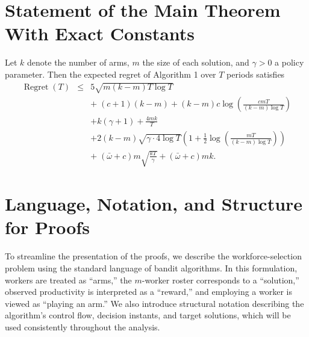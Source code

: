 \documentclass[opre,blindrev]{informs3}
\newcommand{\Regret}{\operatorname{Regret}}
\begin{document}
\newpage
\begin{APPENDICES}



    
\vspace{.1in}


\section{Statement of the Main Theorem With Exact Constants}\label{sec:thm-all-constants}
Let \(k\) denote the number of arms, \(m\) the size of each solution, and \(\gamma>0\) a policy parameter. Then the expected regret of Algorithm 1 over \(T\) periods satisfies
\begin{eqnarray*}
    \Regret(T) &\leq& 5\sqrt{m(k-m)T\log T}\\
    &&+\;(c+1)(k-m) +(k-m)c\log\left(\frac{cmT}{(k-m)\log T}\right)\\
    &&+ k(\gamma + 1) + \frac{4mk}{T}\\
    &&+2(k-m)\sqrt{\gamma \cdot 4\log T}
    \left(1+\frac{1}{2}\log\!\left(\frac{mT}{(k-m)\log T}\right)\right)\\
    &&+\;(\bar{\omega}+c) m\sqrt{\frac{kT}{\gamma}} + (\bar{\omega}+c)mk.
\end{eqnarray*}

\section{Language, Notation, and Structure for Proofs}
To streamline the presentation of the proofs, we describe the workforce-selection problem using the standard language of bandit algorithms. In this formulation, workers are treated as ``arms,'' the \(m\)-worker roster corresponds to a ``solution,'' observed productivity is interpreted as a ``reward,'' and employing a worker is viewed as ``playing an arm.'' We also introduce structural notation describing the algorithm's control flow, decision instants, and target solutions, which will be used consistently throughout the analysis.


\end{APPENDICES}
\end{document}
